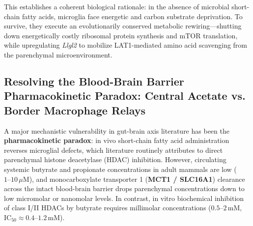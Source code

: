 \documentclass[10pt,a4paper]{article}
\begin{document}
This establishes a coherent biological rationale: in the absence of microbial short-chain fatty acids, microglia face energetic and carbon substrate deprivation. To survive, they execute an evolutionarily conserved metabolic rewiring---shutting down energetically costly ribosomal protein synthesis and mTOR translation, while upregulating \textit{Llgl2} to mobilize LAT1-mediated amino acid scavenging from the parenchymal microenvironment.

\subsection{Resolving the Blood-Brain Barrier Pharmacokinetic Paradox: Central Acetate vs. Border Macrophage Relays}
A major mechanistic vulnerability in gut-brain axis literature has been the \textbf{pharmacokinetic paradox}: in vivo short-chain fatty acid administration reverses microglial defects, which literature routinely attributes to direct parenchymal histone deacetylase (HDAC) inhibition. However, circulating systemic butyrate and propionate concentrations in adult mammals are low ($1\text{--}10\,\mu\text{M}$), and monocarboxylate transporter 1 (\textbf{MCT1 / SLC16A1}) clearance across the intact blood-brain barrier drops parenchymal concentrations down to low micromolar or nanomolar levels. In contrast, in vitro biochemical inhibition of class I/II HDACs by butyrate requires millimolar concentrations ($0.5\text{--}2\,\text{mM}$, $\text{IC}_{50} \approx 0.4\text{--}1.2\,\text{mM}$).
\end{document}
